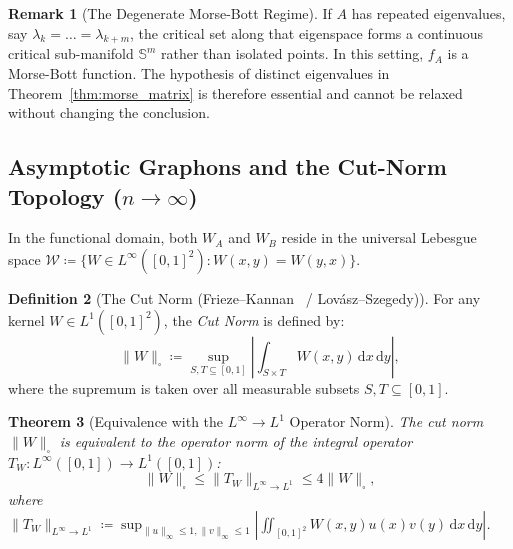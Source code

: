 \documentclass[11pt,a4paper,reqno]{amsart}
\newtheorem{theorem}{Theorem}[section]
\theoremstyle{definition}
\newtheorem{definition}[theorem]{Definition}
\newtheorem{remark}[theorem]{Remark}
\numberwithin{equation}{section}
\providecommand{\Sph}{\mathbb{S}}
\providecommand{\cutnorm}[1]{\|#1\|_{\square}}
\newcommand{\dif}{\,\mathrm{d}}
\begin{document}
\begin{remark}[The Degenerate Morse-Bott Regime]
If $A$ has repeated eigenvalues, say $\lambda_k = \dots = \lambda_{k+m}$, the critical set along that eigenspace forms a continuous critical sub-manifold $\Sph^m$ rather than isolated points. In this setting, $f_A$ is a Morse-Bott function. The hypothesis of distinct eigenvalues in Theorem~\ref{thm:morse_matrix} is therefore essential and cannot be relaxed without changing the conclusion.
\end{remark}

\subsection{Asymptotic Graphons and the Cut-Norm Topology (\texorpdfstring{$n \to \infty$}{n -> infty})}
\label{subsec:graphon_cutnorm}

In the functional domain, both $W_A$ and $W_B$ reside in the universal Lebesgue space $\mathcal{W} \coloneqq \{W \in L^\infty([0, 1]^2) \colon W(x, y) = W(y, x)\}$.

\begin{definition}[The Cut Norm (Frieze--Kannan~\cite{frieze1999quick} / Lov\'asz--Szegedy)]
For any kernel $W \in L^1([0, 1]^2)$, the \emph{Cut Norm} is defined by:
\begin{equation}
    \label{eq:cut_norm_def}
    \cutnorm{W} \coloneqq \sup_{S, T \subseteq [0, 1]} \left| \int_{S \times T} W(x, y) \dif x \dif y \right|,
\end{equation}
where the supremum is taken over all measurable subsets $S, T \subseteq [0, 1]$.
\end{definition}

\begin{theorem}[Equivalence with the $L^\infty \to L^1$ Operator Norm]
\label{thm:grothendieck_cutnorm}
The cut norm $\cutnorm{W}$ is equivalent to the operator norm of the integral operator $T_W \colon L^\infty([0,1]) \to L^1([0,1])$:
\begin{equation}
    \cutnorm{W} \le \|T_W\|_{L^\infty \to L^1} \le 4 \cutnorm{W},
\end{equation}
where $\|T_W\|_{L^\infty \to L^1} \coloneqq \sup_{\|u\|_\infty \le 1, \|v\|_\infty \le 1} \left| \iint_{[0,1]^2} W(x, y) u(x) v(y) \dif x \dif y \right|$.
\end{theorem}
\end{document}
